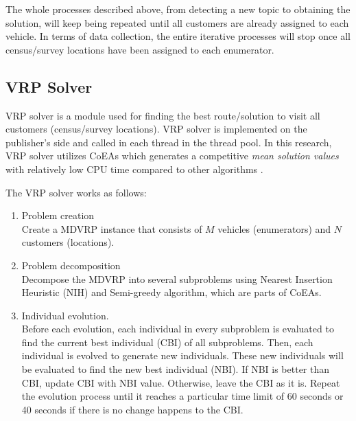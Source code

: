 \documentclass[conference]{IEEEtran}
\begin{document}
The whole processes described above, from detecting a new topic to obtaining the solution, will keep being repeated until all customers are already assigned to each vehicle. In terms of data collection, the entire iterative processes will stop once all census/survey locations have been assigned to each enumerator. 





\subsection{VRP Solver}
\label{ssec:vrp-solver}
VRP solver is a module used for finding the best route/solution to visit all customers (census/survey locations). VRP solver is implemented on the publisher's side and called in each thread in the thread pool. In this research, VRP solver utilizes CoEAs which generates a competitive \textit{mean solution values} with relatively low CPU time compared to other algorithms \cite{de_oliveira_cooperative_2016}. 

The VRP solver works as follows:
\begin{enumerate}
	\item Problem creation \\
	Create a MDVRP instance that consists of $M$ vehicles (enumerators) and $N$ customers (locations).
	\item Problem decomposition \\
	Decompose the MDVRP into several subproblems using Nearest Insertion Heuristic (NIH) and Semi-greedy algorithm, which are parts of CoEAs. 
	\item Individual evolution. \\
	Before each evolution, each individual in every subproblem is evaluated to find the current best individual (CBI) of all subproblems. Then, each individual is evolved to generate new individuals. These new individuals will be evaluated to find the new best individual (NBI). If NBI is better than CBI, update CBI with NBI value. Otherwise, leave the CBI as it is. Repeat the evolution process until it reaches a particular time limit of 60 seconds or 40 seconds if there is no change happens to the CBI.    
\end{enumerate}
\end{document}
